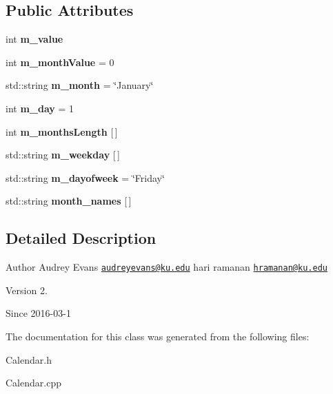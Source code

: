 \subsection*{Public Attributes}
\begin{DoxyCompactItemize}
\item 
\hypertarget{classCalendar_a343e7806248bdbe1f0ca1f7a751f14cc}{}int {\bfseries m\+\_\+value}\label{classCalendar_a343e7806248bdbe1f0ca1f7a751f14cc}

\item 
\hypertarget{classCalendar_a2392b3ccbde707c47f7f8036061fdd80}{}int {\bfseries m\+\_\+month\+Value} = 0\label{classCalendar_a2392b3ccbde707c47f7f8036061fdd80}

\item 
\hypertarget{classCalendar_a75383e56d1c7a66e306cdc748304969f}{}std\+::string {\bfseries m\+\_\+month} = \char`\"{}January\char`\"{}\label{classCalendar_a75383e56d1c7a66e306cdc748304969f}

\item 
\hypertarget{classCalendar_a9b4fa9f2c429d473d2db000dc54e395e}{}int {\bfseries m\+\_\+day} = 1\label{classCalendar_a9b4fa9f2c429d473d2db000dc54e395e}

\item 
\hypertarget{classCalendar_ae9cd01e685db22526f46f11fd1f24239}{}int {\bfseries m\+\_\+months\+Length} \mbox{[}$\,$\mbox{]}\label{classCalendar_ae9cd01e685db22526f46f11fd1f24239}

\item 
\hypertarget{classCalendar_a0f75368bd44c0cf1735830a2fdd28dff}{}std\+::string {\bfseries m\+\_\+weekday} \mbox{[}$\,$\mbox{]}\label{classCalendar_a0f75368bd44c0cf1735830a2fdd28dff}

\item 
\hypertarget{classCalendar_ac14141809f97466e0ccb1035a7c1164f}{}std\+::string {\bfseries m\+\_\+dayofweek} = \char`\"{}Friday\char`\"{}\label{classCalendar_ac14141809f97466e0ccb1035a7c1164f}

\item 
\hypertarget{classCalendar_a53c97a07197777a99305b8ba9b4165ae}{}std\+::string {\bfseries month\+\_\+names} \mbox{[}$\,$\mbox{]}\label{classCalendar_a53c97a07197777a99305b8ba9b4165ae}

\end{DoxyCompactItemize}


\subsection{Detailed Description}
\begin{DoxyAuthor}{Author}
Audrey Evans \href{mailto:audreyevans@ku.edu}{\tt audreyevans@ku.\+edu} hari ramanan \href{mailto:hramanan@ku.edu}{\tt hramanan@ku.\+edu} 
\end{DoxyAuthor}
\begin{DoxyVersion}{Version}
2. ~ 
\end{DoxyVersion}
\begin{DoxySince}{Since}
2016-\/03-\/1 
\end{DoxySince}


The documentation for this class was generated from the following files\+:\begin{DoxyCompactItemize}
\item 
Calendar.\+h\item 
Calendar.\+cpp\end{DoxyCompactItemize}
